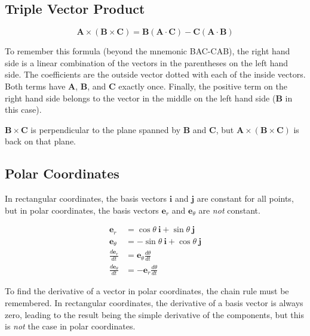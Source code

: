 \subsection{Triple Vector Product}
\begin{equation*}
    \mathbf{A} \times (\mathbf{B} \times \mathbf{C})=\mathbf{B}(\mathbf{A} \cdot \mathbf{C}) - \mathbf{C}(\mathbf{A} \cdot \mathbf{B})
\end{equation*}

To remember this formula (beyond the mnemonic BAC-CAB), the right hand side is a linear combination of the vectors in the parentheses on the left hand side. The coefficients are the outside vector dotted with each of the inside vectors. Both terms have $\mathbf{A}$, $\mathbf{B}$, and $\mathbf{C}$ exactly once. Finally, the positive term on the right hand side belongs to the vector in the middle on the left hand side ($\mathbf{B}$ in this case).

$\mathbf{B} \times \mathbf{C}$ is perpendicular to the plane spanned by $\mathbf{B}$ and $\mathbf{C}$, but $\mathbf{A} \times (\mathbf{B} \times \mathbf{C})$ is back on that plane.

\subsection{Polar Coordinates}

In rectangular coordinates, the basis vectors $\mathbf{i}$ and $\mathbf{j}$ are constant for all points, but in polar coordinates, the basis vectors $\mathbf{e}_r$ and $\mathbf{e}_\theta$ are \emph{not} constant.

\begin{align*}
    \mathbf{e}_r                  & = \cos\theta~\mathbf{i} + \sin\theta~\mathbf{j}  \\
    \mathbf{e}_\theta             & = -\sin\theta~\mathbf{i} + \cos\theta~\mathbf{j} \\
    \frac{d\mathbf{e}_r}{dt}      & = \mathbf{e}_{\theta} \frac{d\theta}{dt}         \\
    \frac{d\mathbf{e}_\theta}{dt} & = -\mathbf{e}_r \frac{d\theta}{dt}
\end{align*}

\vsp

To find the derivative of a vector in polar coordinates, the chain rule must be remembered. In rectangular coordinates, the derivative of a basis vector is always zero, leading to the result being the simple derivative of the components, but this is \emph{not} the case in polar coordinates.

